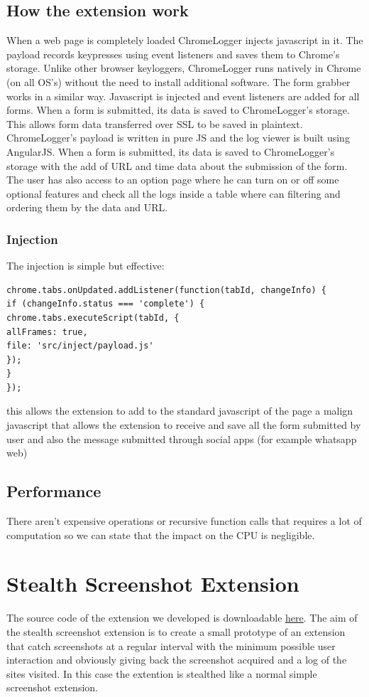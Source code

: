 \documentclass[12pt]{article}
\begin{document}
\begin{multicols}{2}
\subsection*{How the extension work}
When a web page is completely loaded ChromeLogger injects javascript in it. The payload records keypresses using event listeners and saves them to Chrome's storage. Unlike other browser keyloggers, ChromeLogger runs natively in Chrome (on all OS's) without the need to install additional software.
The form grabber works in a similar way. Javascript is injected and event listeners are added for all forms. When a form is submitted, its data is saved to ChromeLogger's storage. This allows form data transferred over SSL to be saved in plaintext.
ChromeLogger's payload is written in pure JS and the log viewer is built using AngularJS. When a form is submitted, its data is saved to ChromeLogger's storage with the add of URL and time data about the submission of the form.
The user has also access to an option page where he can turn on or off some optional features and check all the logs inside a table where can filtering and ordering them by the data and URL.
\subsubsection*{Injection}
The injection is simple but effective:
\begin{lstlisting}
chrome.tabs.onUpdated.addListener(function(tabId, changeInfo) {
if (changeInfo.status === 'complete') {
chrome.tabs.executeScript(tabId, {
allFrames: true, 
file: 'src/inject/payload.js'
});
}
});
\end{lstlisting}
this allows the extension to add to the standard javascript of the page a malign javascript that allows the extension to receive and save all the form submitted by user and also the message submitted through social apps (for example whatsapp web)
\subsection*{Performance}
There aren't expensive operations or recursive function calls that requires a lot of computation so we can state that the impact on the CPU is negligible.
\section*{Stealth Screenshot Extension}
The source code of the extension we developed is downloadable \href{https://github.com/Trexy94/Stealth-screenshot}{here}. The aim of the stealth screenshot extension is to create a small prototype of an extension that catch screenshots at a regular interval with the minimum possible user interaction and obviously giving back the screenshot acquired and a log of the sites visited. In this case the extention is stealthed like a normal simple screenshot extension.

\end{multicols}
\end{document}
